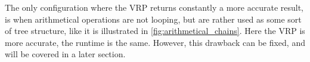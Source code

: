
\label{VRP_king}
The only configuration where the VRP returns constantly a more accurate result, is when arithmetical operations are not looping, but are rather used as some sort of tree structure, like it is illustrated in \ref{fig:arithmetical_chains}. Here the VRP is more accurate, the runtime is the same. However, this drawback can be fixed, and will be covered in a later section.

